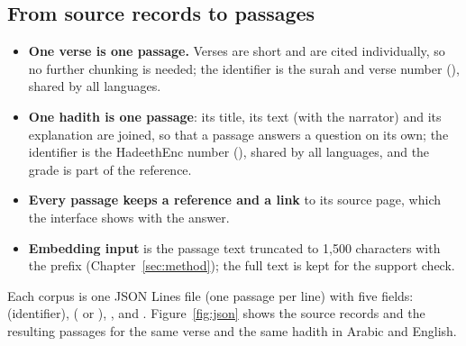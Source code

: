 \subsection{From source records to passages}
\begin{itemize}[leftmargin=*,itemsep=1pt]
  \item \textbf{One verse is one passage.} Verses are short and are cited individually, so no further chunking is needed;
        the identifier is the surah and verse number (), shared by all languages.
  \item \textbf{One hadith is one passage}: its title, its text (with the narrator) and its explanation are joined, so
        that a passage answers a question on its own; the identifier is the HadeethEnc number (), shared by
        all languages, and the grade is part of the reference.
  \item \textbf{Every passage keeps a reference and a link} to its source page, which the interface shows with the
        answer.
  \item \textbf{Embedding input} is the passage text truncated to 1,500 characters with the  prefix
        (Chapter~\ref{sec:method}); the full text is kept for the support check.
\end{itemize}
Each corpus is one JSON Lines file (one passage per line) with five fields:  (identifier), 
( or ), ,  and . Figure~\ref{fig:json} shows the source
records and the resulting passages for the same verse and the same hadith in Arabic and English.

